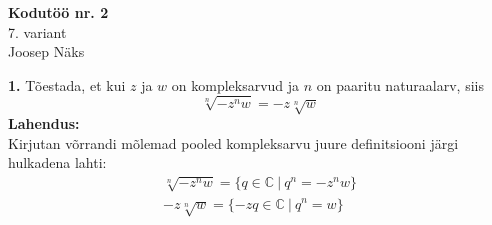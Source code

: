 \documentclass{article}
\begin{document}
\begin{center}
\Large\textbf{Kodutöö nr. 2}\\
7. variant\\
\small{Joosep Näks}
\end{center}
\textbf{1. } Tõestada, et kui $z$ ja $w$ on kompleksarvud ja $n$ on paaritu naturaalarv, siis
\begin {equation*}
\sqrt[n]{-z^nw}=-z\sqrt[n]{w}
\end{equation*}
\textbf{Lahendus:}\\
Kirjutan võrrandi mõlemad pooled kompleksarvu juure definitsiooni järgi hulkadena lahti:
\begin{gather*}
\sqrt[n]{-z^nw}=\{q\in\mathbb{C}\ |\ q^n=-z^nw\}\\
-z\sqrt[n]{w}=\{-zq\in\mathbb{C}\ |\ q^n=w\}\\
\end{gather*}
\end{document}
